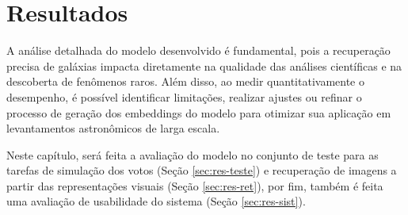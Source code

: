 \chapter{Resultados}
\label{cap:resultados}

A análise detalhada do modelo desenvolvido é fundamental, pois a recuperação precisa de galáxias impacta diretamente na qualidade das análises científicas e na descoberta de fenômenos raros. Além disso, ao medir quantitativamente o desempenho, é possível identificar limitações, realizar ajustes ou refinar o processo de geração dos embeddings do modelo para otimizar sua aplicação em levantamentos astronômicos de larga escala.

Neste capítulo, será feita a avaliação do modelo no conjunto de teste para as tarefas de simulação dos votos (Seção \ref{sec:res-teste}) e recuperação de imagens a partir das representações visuais (Seção \ref{sec:res-ret}), por fim, também é feita uma avaliação de usabilidade do sistema (Seção \ref{sec:res-sist}).







\chaptersep
